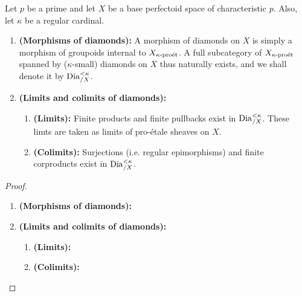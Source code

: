                 \begin{proposition} \label{prop: the_category_of_diamonds}
                    Let $p$ be a prime and let $X$ be a base perfectoid space of characteristic $p$. Also, let $\kappa$ be a regular cardinal.
                        \begin{enumerate}
                            \item \textbf{(Morphisms of diamonds):} A morphism of diamonds on $X$ is simply a morphism of groupoids internal to $X_{\kappa\text{-}\mathrm{pro\acute{e}t}}$. A full subcategory of $X_{\kappa\text{-}\mathrm{pro\acute{e}t}}$ spanned by ($\kappa$-small) diamonds on $X$ thus naturally exists, and we shall denote it by $\mathrm{Dia}_{/X}^{< \kappa}$. 
                            \item \textbf{(Limits and colimits of diamonds):}
                                \begin{enumerate}
                                    \item \textbf{(Limits):} Finite products and finite pullbacks exist in $\mathrm{Dia}_{/X}^{< \kappa}$. These limts are taken as limits of pro-\'etale sheaves on $X$. 
                                    \item \textbf{(Colimits):} Surjections (i.e. regular epimorphisms) and finite corproducts exist in $\mathrm{Dia}_{/X}^{< \kappa}$.
                                \end{enumerate}
                        \end{enumerate}
                \end{proposition}
                    \begin{proof}
                        \noindent
                        \begin{enumerate}
                            \item \textbf{(Morphisms of diamonds):}
                            \item \textbf{(Limits and colimits of diamonds):}
                                \begin{enumerate}
                                    \item \textbf{(Limits):}
                                    \item \textbf{(Colimits):}
                                \end{enumerate}
                        \end{enumerate}
                    \end{proof}
                    
